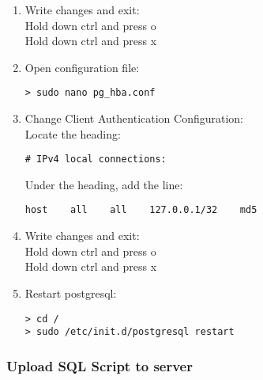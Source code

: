 \documentclass[a4paper]{report}
\begin{document}
\begin{enumerate}
      \item Write changes and exit:\\
      Hold down ctrl and press o\\
      Hold down ctrl and press x

      \item Open configuration file:
      \begin{verbatim}
> sudo nano pg_hba.conf
      \end{verbatim}

      \item Change Client Authentication Configuration:\\Locate the heading: 
      \begin{verbatim}
# IPv4 local connections:
      \end{verbatim}
      Under the heading, add the line:
      \begin{verbatim}
host    all    all    127.0.0.1/32    md5
      \end{verbatim}

      \item Write changes and exit:\\
      Hold down ctrl and press o\\
      Hold down ctrl and press x

      \item Restart postgresql:
      \begin{verbatim}
> cd /
> sudo /etc/init.d/postgresql restart
      \end{verbatim}

    \end{enumerate}

    \subsubsection{Upload SQL Script to server}
\end{document}
